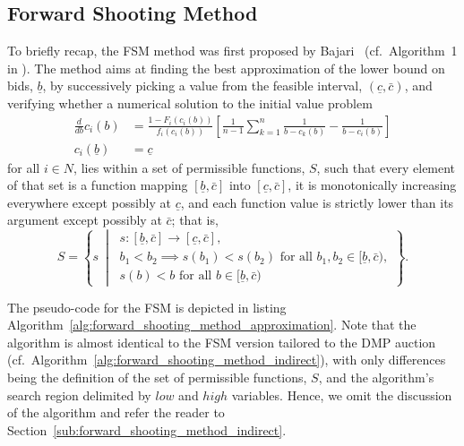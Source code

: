 \subsection{Forward Shooting Method} %
\label{sub:forward_shooting_method}
To briefly recap, the FSM method was first proposed by Bajari~\cite{Bajari2001a} (cf.~Algorithm~1 in \cite{Bajari2001a}). The method aims at finding the best approximation of the lower bound on bids, $\underline{b}$, by successively picking a value from the feasible interval, $(\underline{c}, \bar{c})$, and verifying whether a numerical solution to the initial value problem
\begin{equation}
  \label{eq:fsm_initial_value_problem_approximation}
  \begin{array}{ll}
     \displaystyle\frac{d}{db}c_i(b) &= \displaystyle\frac{1 - F_i(c_i(b))}{f_i(c_i(b))}\left[ \frac{1}{n-1}\sum_{k=1}^n \frac{1}{b-c_k(b)} - \frac{1}{b-c_i(b)} \right]\\[2ex]
    c_i(\underline{b}) &= \underline{c}
  \end{array}
\end{equation}
for all $i\in N$, lies within a set of permissible functions, $S$, such that every element of that set is a function mapping $[\underline{b}, \bar{c}]$ into $[\underline{c}, \bar{c}]$, it is monotonically increasing everywhere except possibly at $\underline{c}$, and each function value is strictly lower than its argument except possibly at $\bar{c}$; that is,
\begin{equation*}
  S=\left\{s \:\middle\vert\:
  \begin{array}{l}
    s: [\underline{b}, \bar{c}]\to [\underline{c}, \bar{c}],\\
    b_1 < b_2\implies s(b_1) < s(b_2) \text{ for all }b_1,b_2\in [\underline{b}, \bar{c}),\\
    s(b) < b \text{ for all }b\in [\underline{b}, \bar{c})
  \end{array}
  \right\}.
\end{equation*}

The pseudo-code for the FSM is depicted in listing Algorithm~\ref{alg:forward_shooting_method_approximation}. Note that the algorithm is almost identical to the FSM version tailored to the DMP auction (cf.~Algorithm~\ref{alg:forward_shooting_method_indirect}), with only differences being the definition of the set of permissible functions, $S$, and the algorithm's search region delimited by $low$ and $high$ variables. Hence, we omit the discussion of the algorithm and refer the reader to Section~\ref{sub:forward_shooting_method_indirect}.

